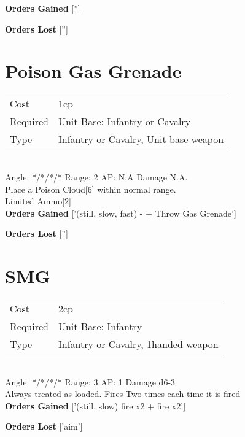 {\bf Orders Gained}
['']

{\bf Orders Lost}
['']
\section{ Poison Gas Grenade }

\begin{tabular}{ll}
    Cost & 1cp \\
    Required & Unit Base: Infantry or Cavalry\\
    Type & Infantry or Cavalry, Unit base weapon\\
\end{tabular}
\ \\
\indent Angle: */*/*/* Range: 2  AP: N.A Damage N.A. \\
Place a Poison Cloud[6] within normal range. \\ Limited Ammo[2]
\ \\

{\bf Orders Gained}
['(still, slow, fast) - + Throw Gas Grenade']

{\bf Orders Lost}
['']
\section{ SMG }

\begin{tabular}{ll}
    Cost & 2cp \\
    Required & Unit Base: Infantry\\
    Type & Infantry or Cavalry, 1handed weapon\\
\end{tabular}
\ \\
\indent Angle: */*/*/* Range: 3  AP: 1 Damage d6-3 \\
Always treated as loaded. Fires Two times each time it is fired
\ \\

{\bf Orders Gained}
['(still, slow) fire x2 + fire x2']

{\bf Orders Lost}
['aim']
